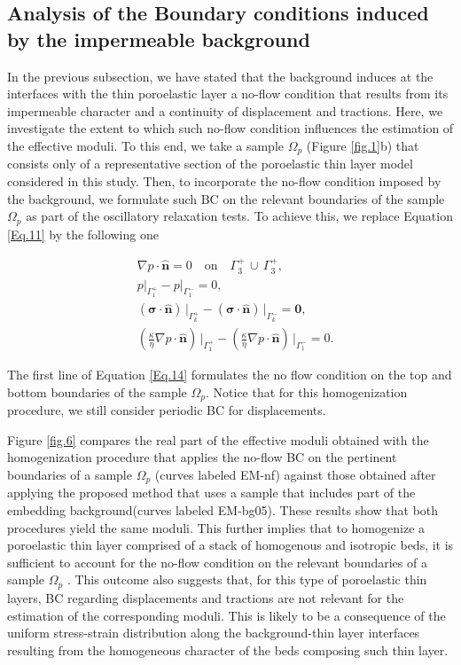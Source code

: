 \documentclass[draft]{agujournal2019}
\begin{document}
\subsection{Analysis of the Boundary conditions induced by the impermeable background} 
In the previous subsection, we have stated that the background induces at the interfaces with the thin poroelastic layer a no-flow condition that results from its impermeable character and a continuity of displacement and tractions. Here, we investigate the extent to which such no-flow condition influences the estimation of the effective moduli. To this end, we  take a sample $\Omega_p$ (Figure \ref{fig.1}b) that consists only of a representative section  of the poroelastic thin layer model considered in this study. Then, to incorporate the no-flow condition imposed by the background, we formulate such BC on the relevant boundaries of the sample $\Omega_p$ as part of the  oscillatory relaxation tests. To achieve this, we replace Equation \ref{Eq.11} by the following one
\begin{linenomath*}
\begin{equation}\label{Eq.14}
\begin{split}
& \nabla p \cdot \bm{\hat n}  = 0 \quad \text{on}\quad \Gamma_3^+ \, \cup \, \Gamma_3^+,\\
& p\vert_{\Gamma_1^+}-p\vert_{\Gamma_1^-} =0, \\
& \left(\bm{\sigma}\cdot \bm{\hat n} \right)\, \vert_{\Gamma_k^+}-\left(\bm{\sigma}\cdot \bm{\hat n} \right)\, \vert_{\Gamma_k^-} = \bm{0},\\
&\left( \frac{\kappa}{\eta} \nabla p \cdot \bm{\hat n} \right) \, \vert_{\Gamma_1^+} -\left( \frac{\kappa}{\eta} \nabla p \cdot \bm{\hat n} \right) \, \vert_{\Gamma_1^-} = 0.
\end{split}
\end{equation}
\end{linenomath*}
The first line of Equation \eqref{Eq.14} formulates the no flow condition on the top and bottom boundaries of the sample $\Omega_p$. Notice that for this homogenization procedure, we still consider periodic BC for displacements. 

Figure \ref{fig.6} compares the real part of the effective moduli obtained with the homogenization procedure that applies the no-flow BC on the pertinent boundaries of a sample  $\Omega_p$ (curves labeled EM-nf) against those obtained after applying the proposed method that uses a sample that includes part of the embedding background(curves labeled EM-bg05). These results show that both procedures yield the same moduli. This further implies that to homogenize a poroelastic thin layer comprised of a stack of homogenous and isotropic beds, it is sufficient to account for the no-flow condition on the relevant boundaries of a sample $\Omega_p$ . This outcome also suggests that, for this type of poroelastic thin layers, BC regarding displacements and tractions are not relevant for the estimation of the corresponding moduli. This is likely to be a consequence of the uniform stress-strain distribution along the background-thin layer interfaces resulting from the homogeneous character of the beds composing such thin layer.
\end{document}
